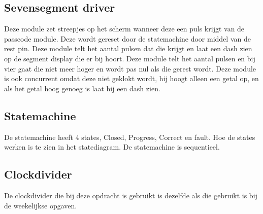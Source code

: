 

\newpage
\subsection{Sevensegment driver}
Deze module zet streepjes op het scherm wanneer deze een puls krijgt van de passcode module. Deze wordt gereset door de statemachine door middel van de rest pin. Deze module telt het aantal pulsen dat die krijgt en laat een dash zien op de segment display die er bij hoort. Deze module telt het aantal pulsen en bij vier gaat die niet meer hoger en wordt pas nul als die gerest wordt. Deze module is ook concurrent omdat deze niet geklokt wordt, hij hoogt alleen een getal op, en als het getal hoog genoeg is laat hij een dash zien.



\newpage
\subsection{Statemachine}
De statemachine heeft 4 states, Closed, Progress, Correct en fault. Hoe de states werken is te zien in het statediagram. De statemachine is sequentieel.




\newpage
\subsection{Clockdivider}
De clockdivider die bij deze opdracht is gebruikt is dezelfde als die gebruikt is bij de weekelijkse opgaven.


